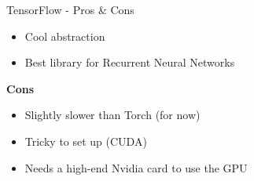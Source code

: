 \documentclass{lug}
\begin{document}
\begin{frame}{TensorFlow - Pros \& Cons}
\begin{itemize}
    \item Cool abstraction
        \item Best library for Recurrent Neural Networks
    \end{itemize}

    \textbf{Cons}

    \begin{itemize}
        \item Slightly slower than Torch (for now)
        \item Tricky to set up (CUDA)
        \item Needs a high-end Nvidia card to use the GPU
    \end{itemize}
\end{frame}
\end{document}
